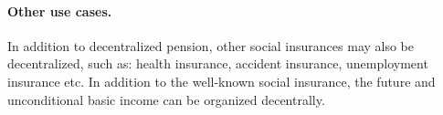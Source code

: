 \paragraph{Other use cases.} In addition to decentralized pension, other social insurances may also be decentralized, such as: health insurance, accident insurance, unemployment insurance etc. In addition to the well-known social insurance, the future and unconditional basic income can be organized decentrally. 
